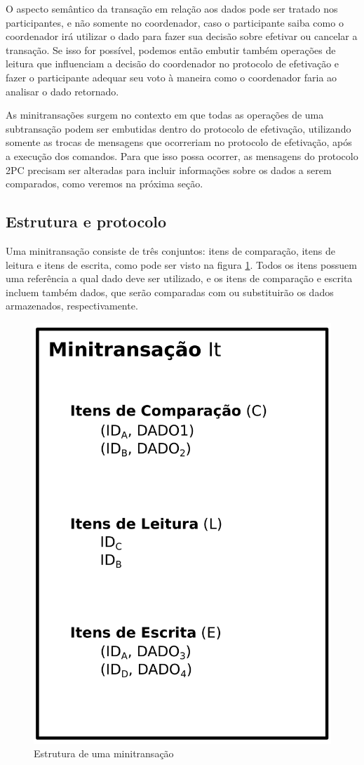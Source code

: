 \documentclass[11pt,twoside,a4paper]{book}
\begin{document}
O aspecto semântico da transação em relação aos dados pode ser tratado nos participantes, e não somente no coordenador, caso o participante saiba como o coordenador irá utilizar o dado para fazer sua decisão sobre efetivar ou cancelar a transação. Se isso for possível, podemos então embutir também operações de leitura que influenciam a decisão do coordenador no protocolo de efetivação e fazer o participante adequar seu voto à maneira como o coordenador faria ao analisar o dado retornado.

As minitransações surgem no contexto em que todas as operações de uma subtransação podem ser embutidas dentro do protocolo de efetivação, utilizando somente as trocas de mensagens que ocorreriam no protocolo de efetivação, após a execução dos comandos. Para que isso possa ocorrer, as mensagens do protocolo 2PC precisam ser alteradas para incluir informações sobre os dados a serem comparados, como veremos na próxima seção.

\subsection{Estrutura e protocolo}
\label{subsec:estrutura-minitransacoes}
Uma minitransação consiste de três conjuntos: itens de comparação, itens de leitura e itens de escrita, como pode ser visto na figura \ref{fig:estrutura_minitransacao}. Todos os itens possuem uma referência a qual dado deve ser utilizado, e os itens de comparação e escrita incluem também dados, que serão comparadas com ou substituirão os dados armazenados, respectivamente. 

\begin{figure}
  \centering
  \includegraphics[width=.40\textwidth]{estrutura_minitransacao} 
  \caption{Estrutura de uma minitransação}
  \label{fig:estrutura_minitransacao} 
\end{figure}
\end{document}
